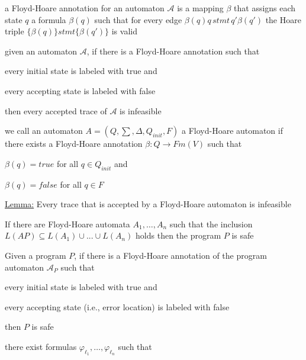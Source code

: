 \documentclass[landscape, a4paper]{article}
\begin{document}
\begin{minipage}[t]{0.2\linewidth}
\begin{betterlist}
\begin{betterlist}
		\end{betterlist}
		\item a \alert{Floyd-Hoare annotation} for an automaton $\mathcal{A}$ is a mapping $\beta$ that assigns each state $q$ a formula $\beta(q)$ such that for every edge $\beta (q)q\, stmt\, q'\beta(q')$ the Hoare triple $\{\beta(q)\}  stmt \{\beta(q′)\}$ is valid
		\item given an automaton $\mathcal{A}$, if there is a Floyd-Hoare annotation such that
		\begin{betterlist}
			\item every initial state is labeled with true and
			\item every accepting state is labeled with false
		\end{betterlist}
		then every accepted trace of $\mathcal{A}$ is infeasible
		\item we call an automaton $A = (Q, \sum , \Delta , Q_{init}, F)$ a \alert{Floyd-Hoare automaton} if there exists a Floyd-Hoare annotation $\beta  : Q \rightarrow Fm(V)$ such that
		\begin{betterlist}
			\item $\beta(q) = true$ for all $q \in Q_{init}$ and
			\item $\beta(q) = false$ for all $q \in F$
		\end{betterlist}
		\item \underline{Lemma:} Every trace that is accepted by a Floyd-Hoare automaton is infeasible
		\item If there are Floyd-Hoare automata $A_{1},\ldots , A_{n}$ such that the inclusion $L(AP) \subseteq L(A_{1}) \cup . . . \cup L(A_{n})$ holds then the program $P$ is safe
	\end{betterlist}
	\begin{betterlist}
		\item Given a program $P$, if there is a Floyd-Hoare annotation of the program automaton $\mathcal{A}_P$ such that
		\begin{betterlist}
			\item every initial state is labeled with true and
			\item every accepting state (i.e., error location) is labeled with false
		\end{betterlist}
		then $P$ is safe
		\begin{betterlist}
			\item there exist formulas $\varphi_{\ell_1},\ldots , \varphi_{\ell_n}$ such that
			\begin{betterlist}

\end{betterlist}
\end{betterlist}
\end{betterlist}
\end{minipage}
\end{document}

